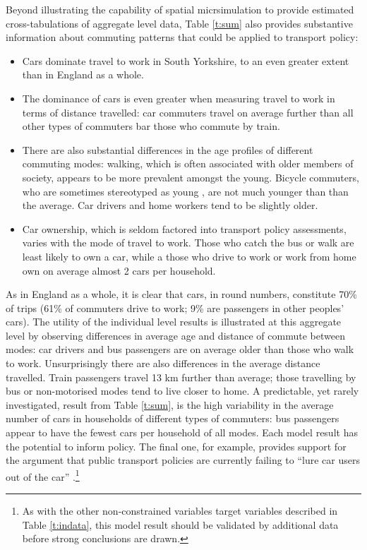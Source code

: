 Beyond illustrating the capability of spatial micrsimulation to provide
estimated cross-tabulations of aggregate level data,
Table \ref{t:sum} also provides substantive information
about commuting patterns that could be applied to transport policy:
\begin{itemize}
 \item Cars dominate travel to work in South Yorkshire, to an
even greater extent than in England as a whole.
\item The dominance of cars is even greater when measuring travel
to work in terms of distance travelled: car commuters travel on
average further than all other types of commuters bar those who commute
by train.
\item There are also substantial differences in the age profiles of
different commuting modes: walking, which is often associated with older
members of society, appears to be more prevalent amongst the young. Bicycle commuters,
who are sometimes stereotyped as young \citep{Daley2011}, are not much younger than
than the average. Car drivers and home workers tend to be slightly older.
\item Car ownership, which is seldom factored into transport policy assessments,
\citep{Kay2011}
varies with the mode of travel to work. Those who catch the bus or walk are least
likely to own a car, while a those who drive to work or work from home own on
average almost 2 cars per household.
\end{itemize}


As in England as a whole, it is clear that cars, in round numbers, constitute
70\% of trips (61\% of commuters drive to work; 9\%
are passengers in other peoples' cars). The utility of the individual level
results is illustrated at this aggregate level by observing differences in
average age and distance of commute between modes: car drivers and bus
passengers are on average older than those who walk to work.
Unsurprisingly there are also differences in the average distance
travelled. Train passengers travel 13 km further than average;
those travelling by bus or non-motorised modes tend to live closer
to home.
A predictable, yet rarely investigated, result from Table \ref{t:sum},
is the high variability in the average number of cars in households of different
types of commuters: bus passengers appear to have the fewest cars per household
of all modes. Each model result has the potential to inform policy. The final one,
for example, provides support for the argument
 that public transport policies are currently failing to
 ``lure car users out of the car''
\citep[p.~193]{Davison2006}.\footnote{As
with the
other non-constrained variables target variables described in Table
\ref{t:indata}, this model result should be validated by additional data before
strong conclusions are drawn.}

